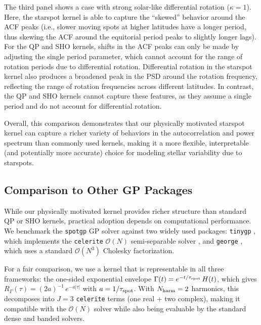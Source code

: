 \documentclass[preprint]{aastex702}
\newcommand{\code}[1]{{\texttt{#1}}}
\begin{document}
The third panel shows a case with strong solar-like differential rotation ($\kappa = 1$). Here, the starspot kernel is able to capture the ``skewed'' behavior around the ACF peaks (i.e., slower moving spots at higher latitudes have a longer period, thus skewing the ACF around the equitorial period peaks to slightly longer lags). For the QP and SHO kernels, shifts in the ACF peaks can only be made by adjusting the single period parameter, which cannot account for the range of rotation periods due to differential rotation. Differential rotation in the starspot kernel also produces a broadened peak in the PSD around the rotation frequency, reflecting the range of rotation frequencies across different latitudes. In contrast, the QP and SHO kernels cannot capture these features, as they assume a single period and do not account for differential rotation. 

Overall, this comparison demonstrates that our physically motivated starspot kernel can capture a richer variety of behaviors in the autocorrelation and power spectrum than commonly used kernels, making it a more flexible, interpretable (and potentially more accurate) choice for modeling stellar variability due to starspots. 

\subsection{Comparison to Other GP Packages} \label{sec:comparison_packages}

While our physically motivated kernel provides richer structure than standard QP or SHO kernels, practical adoption depends on computational performance. We benchmark the \code{spotgp} GP solver against two widely used packages: \code{tinygp} \citep{foreman-mackey_tinygp_2024}, which implements the \code{celerite} $\mathcal{O}(N)$ semi-separable solver \citep{foreman-mackey_fast_2017}, and \code{george} \citep{ambikasaran_fast_2015}, which uses a standard $\mathcal{O}(N^3)$ Cholesky factorization.

For a fair comparison, we use a kernel that is representable in all three frameworks: the one-sided exponential envelope $\Gamma(t) = e^{-t/\tau_{\rm spot}}\,H(t)$, which gives $R_\Gamma(\tau) = (2a)^{-1}\,e^{-a|\tau|}$ with $a = 1/\tau_{\rm spot}$. With $N_{\rm harm} = 2$ harmonics, this decomposes into $J = 3$ \code{celerite} terms (one real + two complex), making it compatible with the $\mathcal{O}(N)$ solver while also being evaluable by the standard dense and banded solvers.
\end{document}
